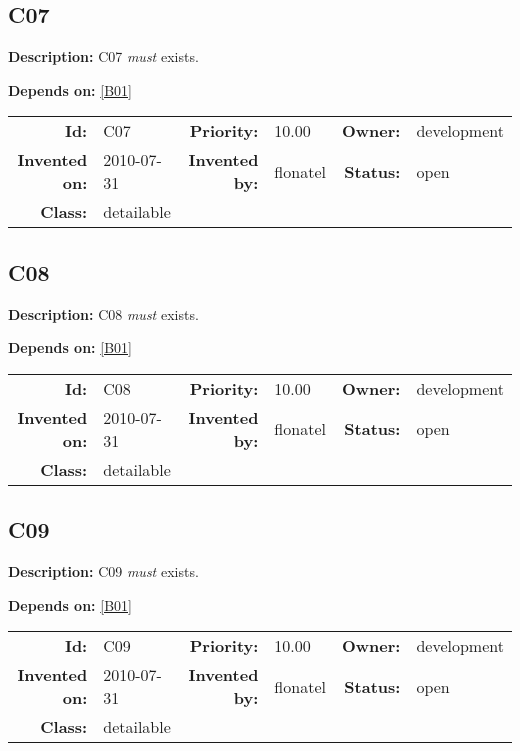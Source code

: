 \subsection{C07}\label{C07}
\textbf{Description:} C07 \textsl{must} exists.

\textbf{Depends on:} \ref{B01} 

\par
{\small \begin{center}\begin{tabular}{rlrlrl}
\textbf{Id:} & C07  & \textbf{Priority:} & 10.00  & \textbf{Owner:} & development\\ 
\textbf{Invented on:} & 2010-07-31  & \textbf{Invented by:} & flonatel  & \textbf{Status:} & open \\ 
\textbf{Class:} & detailable  & & & \end{tabular}\end{center} }
\subsection{C08}\label{C08}
\textbf{Description:} C08 \textsl{must} exists.

\textbf{Depends on:} \ref{B01} 

\par
{\small \begin{center}\begin{tabular}{rlrlrl}
\textbf{Id:} & C08  & \textbf{Priority:} & 10.00  & \textbf{Owner:} & development\\ 
\textbf{Invented on:} & 2010-07-31  & \textbf{Invented by:} & flonatel  & \textbf{Status:} & open \\ 
\textbf{Class:} & detailable  & & & \end{tabular}\end{center} }
\subsection{C09}\label{C09}
\textbf{Description:} C09 \textsl{must} exists.

\textbf{Depends on:} \ref{B01} 

\par
{\small \begin{center}\begin{tabular}{rlrlrl}
\textbf{Id:} & C09  & \textbf{Priority:} & 10.00  & \textbf{Owner:} & development\\ 
\textbf{Invented on:} & 2010-07-31  & \textbf{Invented by:} & flonatel  & \textbf{Status:} & open \\ 
\textbf{Class:} & detailable  & & & \end{tabular}\end{center} }
